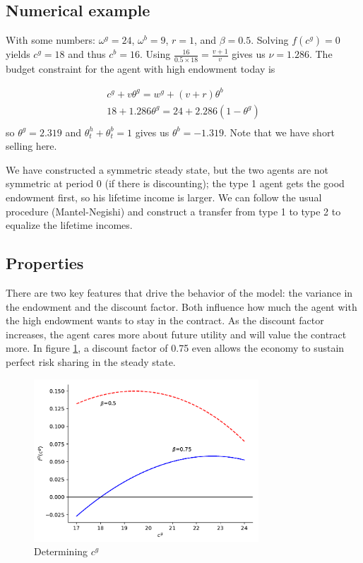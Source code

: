 \documentclass[11pt, pdftex]{article}
\begin{document}
\subsection*{Numerical example}
With some numbers: ${\omega ^g} = 24$, ${\omega ^b} = 9$, $r = 1$, and $\beta  = 0.5$.  Solving $f\left( {{c^g}} \right) = 0$ yields ${c^g} = 18$ and thus ${c^b} = 16$. Using $\frac{{16}}{{0.5 \times 18}} = \frac{{v + 1}}{v}$ gives us $\nu  = 1.286$.   The budget constraint for the agent with high endowment today is

\[\begin{gathered}
  {c^g} + v{\theta ^g} = {w^g} + \left( {v + r} \right){\theta ^b} \\
  18 + 1.286{\theta ^g} = 24 + 2.286\left( {1 - {\theta ^g}} \right) \\
\end{gathered} \]
so ${\theta ^g} = 2.319$ and $\theta _t^h + \theta _t^b = 1$ gives us ${\theta ^b} =  - 1.319$.  Note that we have short selling here.

We have constructed a symmetric steady state, but the two agents are not symmetric at period 0 (if there is discounting); the type 1 agent gets the good endowment first, so his lifetime income is larger.    We can follow the usual procedure (Mantel-Negishi) and construct a transfer from type 1 to type 2 to equalize the lifetime incomes.

\subsection*{Properties}

There are two key features that drive the behavior of the model: the variance in the endowment and the discount factor.  Both influence how much the agent with the high endowment wants to stay in the contract.  As the discount factor increases, the agent cares more about future utility and will value the contract more.  In figure \ref{fig:fd}, a discount factor of 0.75 even allows the economy to sustain perfect risk sharing in the steady state.
\begin{figure}
  \centering
  \includegraphics[width=0.75\textwidth]{figures/fd.pdf}
  \caption{Determining $c^g$}\label{fig:fd}
\end{figure}
\end{document}
